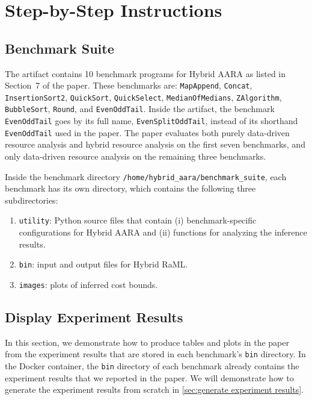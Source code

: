 
\section{Step-by-Step Instructions}

\subsection{Benchmark Suite}

The artifact contains 10 benchmark programs for Hybrid AARA as listed in
Section~7 of the paper.
%
These benchmarks are: \texttt{MapAppend}, \texttt{Concat},
\texttt{InsertionSort2}, \texttt{QuickSort}, \texttt{QuickSelect},
\texttt{MedianOfMedians}, \texttt{ZAlgorithm}, \texttt{BubbleSort},
\texttt{Round}, and \texttt{EvenOddTail}.
%
Inside the artifact, the benchmark \texttt{EvenOddTail} goes by its full name,
\texttt{EvenSplitOddTail}, instead of its shorthand \texttt{EvenOddTail} used
in the paper.
%
The paper evaluates both purely data-driven resource analysis and hybrid
resource analysis on the first seven benchmarks, and only data-driven resource
analysis on the remaining three benchmarks.

Inside the benchmark directory \texttt{/home/hybrid\_aara/benchmark\_suite},
each benchmark has its own directory, which contains the following three
subdirectories:
\begin{enumerate}
  \item \texttt{utility}: Python source files that contain (i)
        benchmark-specific configurations for Hybrid AARA and (ii) functions for
        analyzing the inference results.
  \item \texttt{bin}: input and output files for Hybrid RaML.
  \item \texttt{images}: plots of inferred cost bounds.
\end{enumerate}

\subsection{Display Experiment Results}
\label{sec:display experiment results}

In this section, we demonstrate how to produce tables and plots in the paper
from the experiment results that are stored in each benchmark's \texttt{bin}
directory.
%
In the Docker container, the \texttt{bin} directory of each benchmark already
contains the experiment results that we reported in the paper.
%
We will demonstrate how to generate the experiment results from scratch in
\cref{sec:generate experiment results}.

